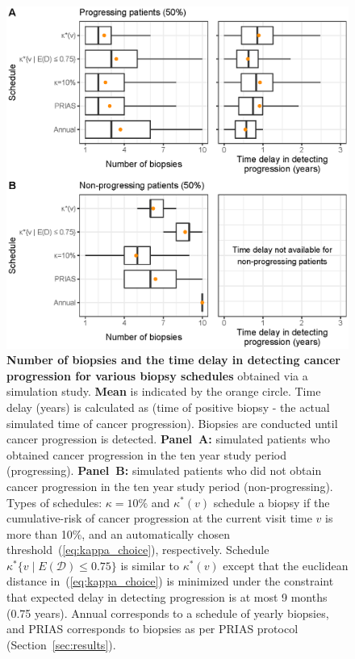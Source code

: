 \documentclass[useAMS, usenatbib, referee]{biom}
\begin{document}
\begin{figure}
\centerline{\includegraphics{simulation_boxplot.eps}}
\caption{\textbf{Number of biopsies and the time delay in detecting cancer progression for various biopsy schedules} obtained via a simulation study. \textbf{Mean} is indicated by the orange circle. Time delay (years) is calculated as (time of positive biopsy - the actual simulated time of cancer progression). Biopsies are conducted until cancer progression is detected. \textbf{Panel~A:} simulated patients who obtained cancer progression in the ten year study period (progressing). \textbf{Panel~B:} simulated patients who did not obtain cancer progression in the ten year study period (non-progressing). Types of schedules: ${\kappa=10\%}$ and $\kappa^*(v)$ schedule a biopsy if the cumulative-risk of cancer progression at the current visit time $v$ is more than 10\%, and an automatically chosen threshold~(\ref{eq:kappa_choice}), respectively. Schedule ${\kappa^*\{v \mid E(\mathcal{D})\leq 0.75\}}$ is similar to $\kappa^*(v)$ except that the euclidean distance in~(\ref{eq:kappa_choice}) is minimized under the constraint that expected delay in detecting progression is at most 9 months (0.75 years). Annual corresponds to a schedule of yearly biopsies, and PRIAS corresponds to biopsies as per PRIAS protocol (Section~\ref{sec:results}).}
\label{fig:simulation_boxplot}
\end{figure}
\end{document}
